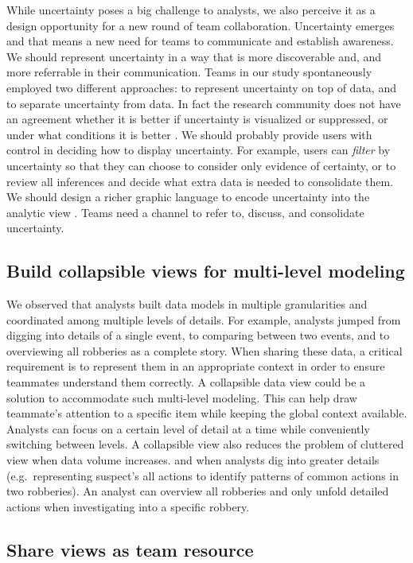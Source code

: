 While uncertainty poses a big challenge to analysts, we also perceive it as a design opportunity for a new round of team collaboration. Uncertainty emerges and that means a new need for teams to communicate and establish awareness. We should represent uncertainty in a way that is more discoverable and, and more referrable in their communication. Teams in our study spontaneously employed two different approaches: 
to represent uncertainty on top of data,  and to separate uncertainty from data. In fact the research community does not have an agreement whether it is better if uncertainty is visualized or suppressed, or under what conditions it is better \citep{Maceachren2005}. We should probably provide users with control in deciding how to display uncertainty. For example, users can \emph{filter} by uncertainty so that they can
choose to consider only evidence of certainty, or to review all
inferences and decide what extra data is needed to consolidate them. We should design a richer graphic language to encode uncertainty into the analytic view \citep{Bertin1983}. Teams need a channel to refer to, discuss, and consolidate uncertainty.

\subsection{Build collapsible views for multi-level modeling}

We observed that analysts built data models in multiple granularities and coordinated among multiple levels of details. For example, analysts jumped from digging into details of a single event, to comparing between two
events, and to overviewing all robberies as a complete story. When sharing these data, a critical requirement is to represent them in an appropriate context in order to ensure teammates understand them correctly. A collapsible data view could be a solution to accommodate such
multi-level modeling. This can help draw teammate's attention to a specific item
while keeping the global context available. Analysts can focus on a certain
level of detail at a time while conveniently switching between levels. A
collapsible view also reduces the problem of cluttered view when data volume
increases.  and when analysts dig into greater
details (e.g.~representing suspect's all actions to identify patterns of common
actions in two robberies). An analyst can overview all robberies and only unfold
detailed actions when investigating into a specific robbery.

\subsection{Share views as team resource}

